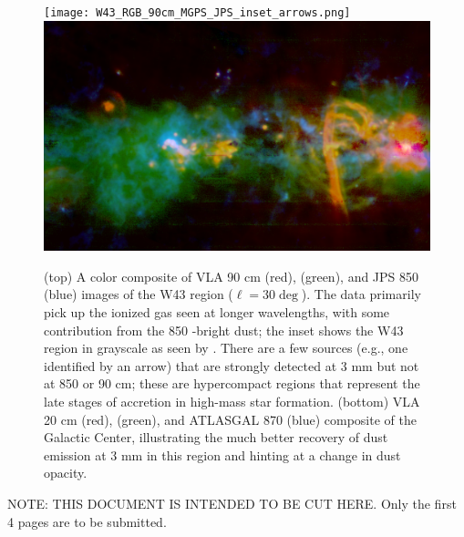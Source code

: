 \documentclass[11pt,preprint]{aastex_nofoot}
\begin{document}
\begin{figure}
\texttt{[image: W43\_RGB\_90cm\_MGPS\_JPS\_inset\_arrows.png]}
\includegraphics[width=16cm]{SgrB2_RGB_20cm_MGPSplanck_ATLASGAL.png}
\caption{
(top) A color composite of VLA 90 cm (red), \MUSTANG (green), and JPS 850 \um (blue)
images of the W43 region ($\ell=30\deg$).  The \MUSTANG data primarily pick up
the ionized gas seen at longer wavelengths, with some contribution from the 
850 \um-bright dust; the inset shows the W43 region in grayscale as seen by
\MUSTANG.  There are a few sources (e.g., one identified by an arrow) that are strongly detected at 3 mm but not
at 850 \um or 90 cm; these are hypercompact \hii regions that represent
the late stages of accretion in high-mass star formation.
(bottom) VLA 20 cm (red), \MUSTANG (green), and ATLASGAL 870 \um (blue) composite
of the Galactic Center, illustrating the much better recovery of dust emission
at 3 mm in this region and hinting at a change in dust opacity.
}
\label{fig:figure}
\end{figure}

\clearpage

NOTE: THIS DOCUMENT IS INTENDED TO BE CUT HERE.  Only the first 4 pages are to be submitted.


% 
% 
% 
\end{document}
